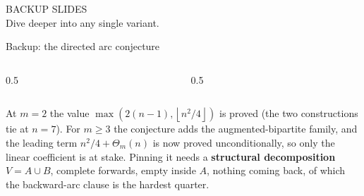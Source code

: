 \documentclass[aspectratio=1610,11pt]{beamer}
\newcommand{\floor}[1]{\left\lfloor #1\right\rfloor}
\begin{document}
\begin{frame}[plain]
\centering\vspace{2.4cm}
{\color{KULblauw3a}\Large BACKUP SLIDES}\\[10pt]
{\color{black!60}Dive deeper into any single variant.}
\end{frame}

\begin{frame}{Backup: the directed arc conjecture}
\begin{columns}[c,onlytextwidth]
  \begin{column}{0.5\textwidth}\centering
  \end{column}
  \begin{column}{0.5\textwidth}\centering
  \end{column}
\end{columns}

\vspace{0.3cm}
At $m=2$ the value $\max(2(n-1),\floor{n^2/4})$ is proved (the two constructions tie at $n=7$).
For $m\ge3$ the conjecture adds the augmented-bipartite family, and the leading term
$n^2/4+\Theta_m(n)$ is now proved unconditionally, so only the linear coefficient is at stake.
Pinning it needs a {\bfseries structural decomposition} $V=A\cup B$, complete forwards, empty
inside $A$, nothing coming back, of which the backward-arc clause is the hardest quarter.
\end{frame}
\end{document}
